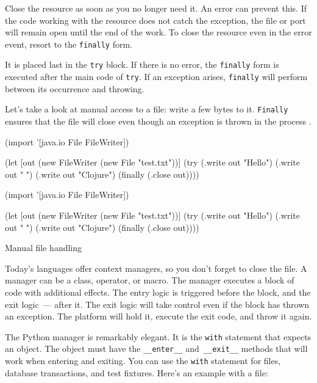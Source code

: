 Close the resource as soon as you no longer need it. An error can prevent this. If the code working with the resource does not catch the exception, the file or port will remain open until the end of the work. To close the resource even in the error event, resort to the \verb|finally| form.

It is placed last in the \verb|try| block. If there is no error, the \verb|finally| form is executed after the main code of \verb|try|. If an exception arises, \verb|finally| will perform between its occurrence and throwing.

Let's take a look at manual access to a file: write a few bytes to it. \verb|Finally| ensures that the file will close even though an exception is thrown in the process .

\begin{listing}[ht!]

\ifx\DEVICETYPE\MOBILE

\begin{clojure}
(import '[java.io File FileWriter])

(let [out (new FileWriter
            (new File "test.txt"))]
  (try
    (.write out "Hello")
    (.write out " ")
    (.write out "Clojure")
    (finally
      (.close out))))
\end{clojure}

\else

\begin{clojure}
(import '[java.io File FileWriter])

(let [out (new FileWriter (new File "test.txt"))]
  (try
    (.write out "Hello")
    (.write out " ")
    (.write out "Clojure")
    (finally
      (.close out))))
\end{clojure}

\fi

\caption{Manual file handling}
\label{fig:write-file}

\end{listing}

Today's languages offer context managers, so you don't forget to close the file. A manager can be a class, operator, or macro.
The manager executes a block of code with additional effects. The entry logic is triggered before the block, and the exit logic~--- after it. The exit logic will take control even if the block has thrown an exception.
The platform will hold it, execute the exit code, and throw it again.


The Python manager is remarkably elegant. It is the \verb|with| statement that expects an object. The object must have the \verb|__enter__| and~\verb|__exit__| methods that will work when entering and exiting. You can use the \verb|with| statement for files, database transactions, and test fixtures. Here's an example with a file:

